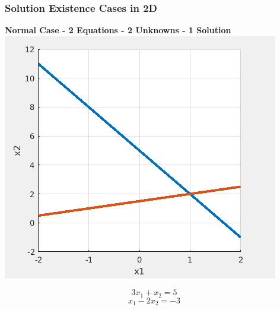 \documentclass[fleqn]{beamer} %
\newcommand{\sectionIIIsubsectionIIItitle}{Solution Existence Cases in 2D}
\begin{document}
			\begin{frame}
				\frametitle{\sectionIIIsubsectionIIItitle}
				\bigskip

				{\bf Normal Case - 2 Equations - 2 Unknowns - 1 Solution} \\ \vspace{2mm}
				\includegraphics[scale=.3]{images/lecture5_fig1.png} \\
				\begin{fleqn}
					\[3x_1+x_2=5\]
					\[x_1-2x_2=-3\]
				\end{fleqn}

				\btVFill
			\end{frame}
\end{document}
